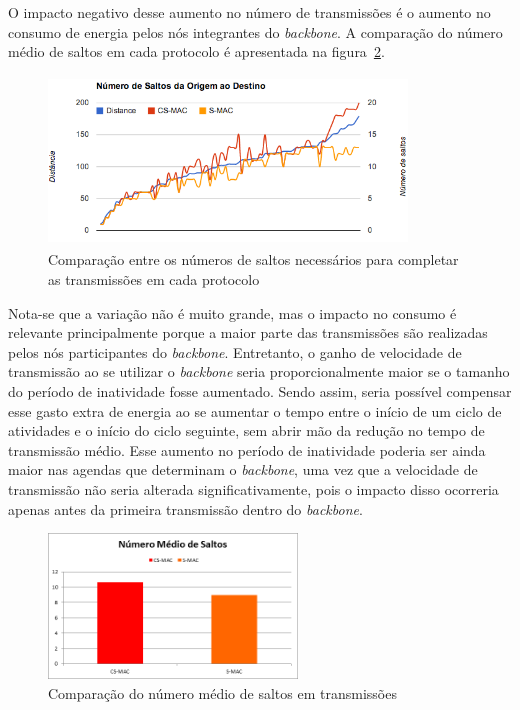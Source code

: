 O impacto negativo desse aumento no número de transmissões é o aumento no consumo de energia pelos nós integrantes do \emph{backbone}. A comparação do número médio de saltos em cada protocolo é apresentada na figura~\ref{fig:averageNumberOfHops}. 

\begin{figure}[!htb]
\centering
\includegraphics[width=360px,height=170px]{./Pictures/NumberOfHopsComparison.png}
\caption{Comparação entre os números de saltos necessários para completar as transmissões em cada protocolo} %
\label{fig:numberOfHopsComparison} %
\end{figure}

Nota-se que a variação não é muito grande, mas o impacto no consumo é relevante principalmente porque a maior parte das transmissões são realizadas pelos nós participantes do \emph{backbone}.  Entretanto, o ganho de velocidade de transmissão ao se utilizar o \emph{backbone} seria proporcionalmente maior se o tamanho do período de inatividade fosse aumentado. Sendo assim, seria possível compensar esse gasto extra de energia ao se aumentar o tempo entre o início de um ciclo de atividades e o início do ciclo seguinte, sem abrir mão da redução no tempo de transmissão médio. Esse aumento no período de inatividade poderia ser ainda maior nas agendas que determinam o \emph{backbone}, uma vez que a velocidade de transmissão não seria alterada significativamente, pois o impacto disso ocorreria apenas antes da primeira transmissão dentro do \emph{backbone}.

\begin{figure}[!htb]
\centering
\includegraphics[width=250px,height=146px]{./Pictures/AverageNumberOfHops.png}
\caption{Comparação do número médio de saltos em transmissões} %
\label{fig:averageNumberOfHops} %
\end{figure}
